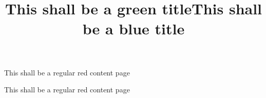 \documentclass[aspectratio=169]{beamer}
\begin{document}
\title{This shall be a green title}
\begin{frame}[mycolor=green]
\titlepage
\end{frame}

\begin{frame}
This shall be a regular red content page
\end{frame}

\title{This shall be a blue title}
\begin{frame}[mycolor=blue]
\titlepage
\end{frame}

\begin{frame}
This shall be a regular red content page
\end{frame}
\end{document}
